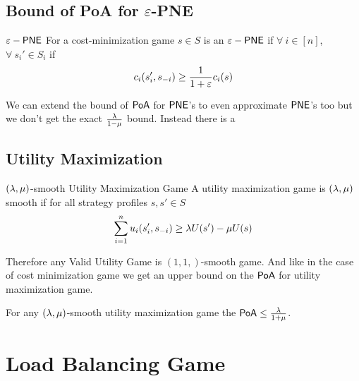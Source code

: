 \subsection{Bound of \textsf{PoA} for \texorpdfstring{$\varepsilon$}{ε}-\textsf{PNE}}
\begin{Definition}{$\varepsilon-\operatorname{\mathsf{PNE}}$}{}
	For a cost-minimization game $s\in S$ is an $\varepsilon-\operatorname{\mathsf{PNE}}$ if $\forall \ i\in[n]$, $\forall\ s_i'\in S_i$ if $$c_i(s_i',s_{-i})\geq \frac{1}{1+\varepsilon}c_i(s)$$\end{Definition}

We can extend the bound of $\operatorname{\mathsf{PoA}}$ for $\operatorname{\mathsf{PNE}}$'s  to even approximate $\operatorname{\mathsf{PNE}}$'s too but we don't get the exact $\frac{\lambda}{1-\mu}$ bound. Instead there is a 

\subsection{Utility Maximization}
\begin{Definition}{$(\lambda,\mu)$-smooth Utility Maximization Game}{}
	A utility maximization game is $(\lambda,\mu)$ smooth if for all strategy profiles $s,s'\in S$ $$\sum\limits_{i=1}^n u_i(s'_i,s_{-i})\geq \lambda U(s')-\mu U(s)$$
\end{Definition}

Therefore any Valid Utility Game is $(1,1,)$-smooth game. And like in the case of cost minimization game we get an upper bound on the $\operatorname{\mathsf{PoA}}$ for utility maximization game.
\begin{Theorem}{}{}
	For any $(\lambda,\mu)$-smooth utility maximization game the $\operatorname{\mathsf{PoA}}\leq \frac{\lambda}{1+\mu}$. 
\end{Theorem}
\section{Load Balancing Game}